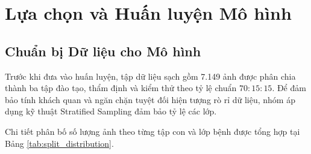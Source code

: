 \section{Lựa chọn và Huấn luyện Mô hình}

\subsection{Chuẩn bị Dữ liệu cho Mô hình}
Trước khi đưa vào huấn luyện, tập dữ liệu sạch gồm 7.149 ảnh được phân chia thành ba tập đào tạo, thẩm định và kiểm thử theo tỷ lệ chuẩn $70:15:15$. Để đảm bảo tính khách quan và ngăn chặn tuyệt đối hiện tượng rò rỉ dữ liệu, nhóm áp dụng kỹ thuật Stratified Sampling đảm bảo tỷ lệ các lớp.

Chi tiết phân bố số lượng ảnh theo từng tập con và lớp bệnh được tổng hợp tại Bảng \ref{tab:split_distribution}.

\begin{table}[htbp]
    \centering
    \caption{Phân bố số lượng ảnh theo tập con, miền và lớp bệnh}
    \label{tab:split_distribution}
\end{table}

